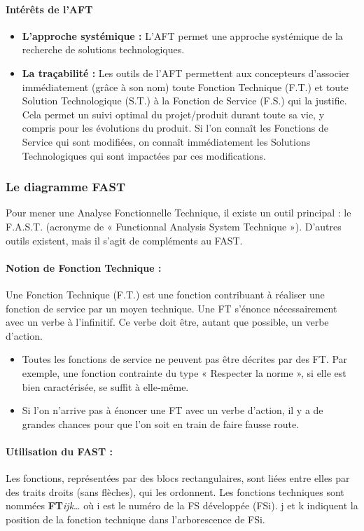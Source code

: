 \paragraph{Intérêts de l’AFT}
\begin{itemize}
    \item \textbf{L’approche systémique : } L’AFT permet une approche systémique de la recherche de solutions technologiques. 
    \item \textbf{La traçabilité : } Les outils de l’AFT permettent aux concepteurs d’associer immédiatement (grâce à son nom) toute Fonction Technique (F.T.) et toute Solution Technologique (S.T.) à la Fonction de Service (F.S.) qui la justifie. Cela permet un suivi optimal du projet/produit durant toute sa vie, y compris pour les évolutions du produit. Si l’on connaît les Fonctions de Service qui sont modifiées, on connaît immédiatement les Solutions Technologiques qui sont impactées par ces modifications.
\end{itemize}



\subsubsection{Le diagramme FAST}
Pour mener une Analyse Fonctionnelle Technique, il existe un outil principal : le F.A.S.T.
(acronyme de « Functionnal Analysis System Technique »). D’autres outils existent, mais il s’agit de
compléments au FAST.

\paragraph{Notion de Fonction Technique :} Une Fonction Technique (F.T.) est une fonction contribuant à réaliser une fonction de service par un moyen technique. Une FT s’énonce nécessairement avec un verbe à l’infinitif. Ce verbe doit être, autant que possible, un verbe d’action.
\begin{itemize}
    \item Toutes les fonctions de service ne peuvent pas être décrites par des FT. Par exemple, une fonction contrainte du type « Respecter la norme », si elle est bien caractérisée, se suffit à elle‐même.
    \item Si l’on n’arrive pas à énoncer une FT avec un verbe d’action, il y a de grandes chances pour que l’on soit en train de faire fausse route.
\end{itemize}

\paragraph{Utilisation du FAST :} Les fonctions, représentées par des blocs rectangulaires, sont liées entre elles par des traits droits (sans flèches), qui les ordonnent. Les fonctions techniques sont nommées \textbf{FT}\textit{ijk}… où i est le numéro de la FS développée (FSi). j et k indiquent la position de la fonction technique dans
l’arborescence de FSi.

